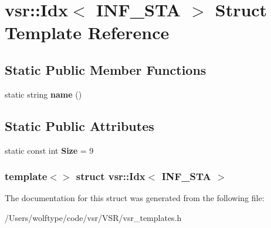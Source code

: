 \hypertarget{structvsr_1_1_idx_3_01_i_n_f___s_t_a_01_4}{\section{vsr\-:\-:Idx$<$ I\-N\-F\-\_\-\-S\-T\-A $>$ Struct Template Reference}
\label{structvsr_1_1_idx_3_01_i_n_f___s_t_a_01_4}
}
\subsection*{Static Public Member Functions}
\begin{DoxyCompactItemize}
\item 
\hypertarget{structvsr_1_1_idx_3_01_i_n_f___s_t_a_01_4_acb8f5ab84ae337b89eb00cb393f58bb8}{static string {\bfseries name} ()}\label{structvsr_1_1_idx_3_01_i_n_f___s_t_a_01_4_acb8f5ab84ae337b89eb00cb393f58bb8}

\end{DoxyCompactItemize}
\subsection*{Static Public Attributes}
\begin{DoxyCompactItemize}
\item 
\hypertarget{structvsr_1_1_idx_3_01_i_n_f___s_t_a_01_4_a86759bb2c545410fdcf1718e3531ae43}{static const int {\bfseries Size} = 9}\label{structvsr_1_1_idx_3_01_i_n_f___s_t_a_01_4_a86759bb2c545410fdcf1718e3531ae43}

\end{DoxyCompactItemize}
\subsubsection*{template$<$$>$ struct vsr\-::\-Idx$<$ I\-N\-F\-\_\-\-S\-T\-A $>$}



The documentation for this struct was generated from the following file\-:\begin{DoxyCompactItemize}
\item 
/\-Users/wolftype/code/vsr/\-V\-S\-R/vsr\-\_\-templates.\-h\end{DoxyCompactItemize}
